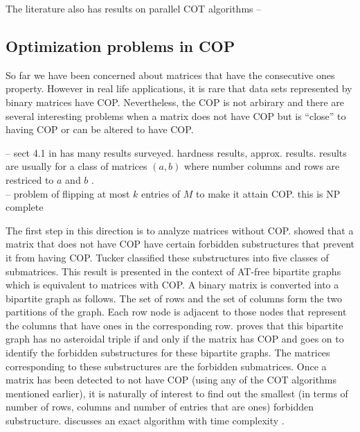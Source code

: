 \documentclass[MS,synopsis]{iitmdiss}
\begin{document}
The literature also has results on parallel COT algorithms --
\cite{as95} \cite{bs03} \cite{ly91}


\subsection{Optimization problems in COP}
So far we have been concerned about
matrices that have the consecutive ones property. However in real life
applications, it is rare that data sets represented by binary matrices
have COP. Nevertheless, the COP is not arbirary and there are several
interesting problems when a matrix does not have COP but is ``close''
to having COP or can be altered to have COP.

-- sect 4.1 in \cite{d08phd} has many results surveyed. hardness results,
approx. results. results are usually for a class of matrices $(a,b)$
where number columns and rows are restriced to $a$ and $b$
.\\
-- problem of flipping at most $k$ entries of $M$ to make it attain
COP. this is NP complete \cite{b75-phd}

The first step in this direction is to analyze matrices without
COP. \cite{at72} showed that a matrix that does not have COP have
certain forbidden substructures that prevent it from having
COP. Tucker classified these substructures into five classes of
submatrices. This result is presented in the context of AT-free
bipartite graphs  which is
equivalent to matrices with COP. A binary matrix is converted into a
bipartite graph as follows. The set of rows and the set of columns
form the two partitions of the graph. Each row node is adjacent to
those nodes that represent the columns that have ones in the
corresponding row. \cite{at72} proves that this bipartite graph has no
asteroidal triple if and only if the matrix has COP and goes on to
identify the forbidden substructures for these bipartite graphs. The
matrices corresponding to these substructures are the forbidden
submatrices. Once a matrix has been detected to not have COP (using
any of the COT algorithms mentioned earlier), it is naturally of
interest to find out the smallest (in terms of number of rows, columns
and number of entries that are ones) forbidden
substructure. \cite{d08phd} discusses an exact algorithm with time
complexity .
\end{document}
